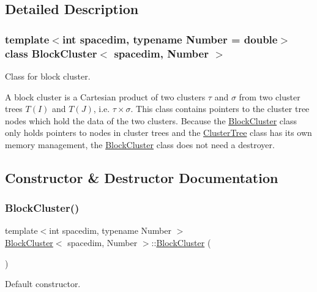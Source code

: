 \subsection{Detailed Description}
\subsubsection*{template$<$int spacedim, typename Number = double$>$\newline
class Block\+Cluster$<$ spacedim, Number $>$}

Class for block cluster. 

A block cluster is a Cartesian product of two clusters $\tau$ and $\sigma$ from two cluster trees $T(I)$ and $T(J)$, i.\+e. $\tau \times \sigma$. This class contains pointers to the cluster tree nodes which hold the data of the two clusters. Because the \hyperlink{classBlockCluster}{Block\+Cluster} class only holds pointers to nodes in cluster trees and the \hyperlink{classClusterTree}{Cluster\+Tree} class has its own memory management, the \hyperlink{classBlockCluster}{Block\+Cluster} class does not need a destroyer. 

\subsection{Constructor \& Destructor Documentation}
\mbox{\label{classBlockCluster_a0b85fdaddc12a14d57db884e287cd24e}} 
\subsubsection{\texorpdfstring{Block\+Cluster()}{BlockCluster()}\hspace{0.1cm}{\footnotesize\ttfamily [1/2]}}
{\footnotesize\ttfamily template$<$int spacedim, typename Number $>$ \\
\hyperlink{classBlockCluster}{Block\+Cluster}$<$ spacedim, Number $>$\+::\hyperlink{classBlockCluster}{Block\+Cluster} (\begin{DoxyParamCaption}{ }\end{DoxyParamCaption})}

Default constructor. \mbox{\label{classBlockCluster_a63fdb3f4bea6a446b34cb34274731df0}} 
